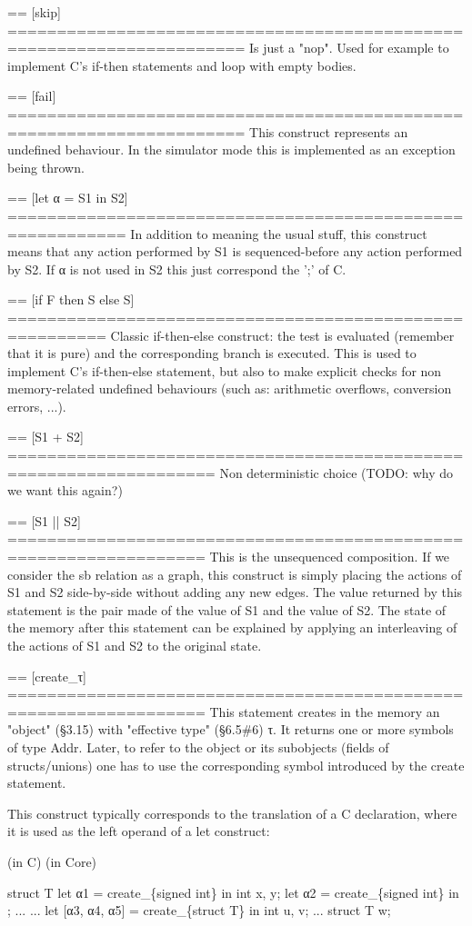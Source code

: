 \documentclass[12pt, a4paper]{article}
\begin{document}
== [skip] ======================================================================
Is just a "nop". Used for example to implement C's if-then statements and loop
with empty bodies.

== [fail] ======================================================================
This construct represents an undefined behaviour. In the simulator mode this is
implemented as an exception being thrown.

== [let α = S1 in S2] ==========================================================
In addition to meaning the usual stuff, this construct means that any action
performed by S1 is sequenced-before any action performed by S2. If α is not used
in S2 this just correspond the ';' of C.

== [if F then S else S] ========================================================
Classic if-then-else construct: the test is evaluated (remember that it is pure)
and the corresponding branch is executed. This is used to implement C's
if-then-else statement, but also to make explicit checks for non memory-related
undefined behaviours (such as: arithmetic overflows, conversion errors, ...).

== [S1 + S2] ===================================================================
Non deterministic choice (TODO: why do we want this again?)


== [S1 || S2] ==================================================================
This is the unsequenced composition. If we consider the sb relation as a graph,
this construct is simply placing the actions of S1 and S2 side-by-side without
adding any new edges. The value returned by this statement is the pair made of
the value of S1 and the value of S2. The state of the memory after this
statement can be explained by applying an interleaving of the actions of S1 and
S2 to the original state.

== [create\_τ] ==================================================================
This statement creates in the memory an "object" (§3.15) with
"effective type" (§6.5\#6) τ. It returns one or more symbols of type Addr. Later,
to refer to the object or its subobjects (fields of structs/unions) one has to
use the corresponding symbol introduced by the create statement. 

This construct typically corresponds to the translation of a C declaration,
where it is used as the left operand of a let construct:

  (in C)        (in Core)
  
  struct T {      let α1 = create\_\{signed int\} in
    int x, y;     let α2 = create\_\{signed int\} in
  };              ...
  ...             let [α3, α4, α5] = create\_\{struct T\} in
  int u, v;       
  ...             
  struct T w;     
\end{document}
